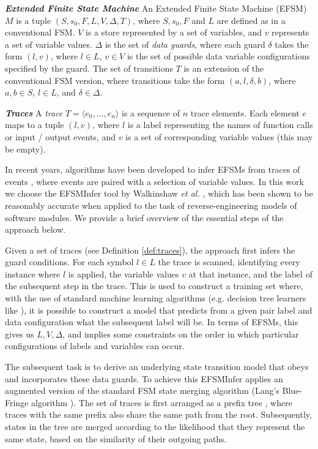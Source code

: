 \documentclass{llncs}
\begin{document}
\begin{definition}\textbf{\emph{Extended Finite State Machine}}
\label{def:efsm}
 An Extended Finite State Machine (EFSM) $M$ is a tuple $(S,s_0,F,L,V,\Delta,T)$, where $S,s_0,F$ and $L$ are defined as in a conventional FSM. $V$ is a store represented by a set of variables, and $v$ represents a set of variable values. $\Delta$ is the set of \emph{data guards}, where each guard $\delta$ takes the form $(l,v)$, where $l \in L$, $v \in V$ is the set of possible data variable configurations specified by the guard. The set of transitions $T$ is an extension of the conventional FSM version, where transitions take the form $(a,l,\delta,b)$, where $a,b \in S$, $l \in L$, and $\delta \in \Delta$. 
\end{definition}
\begin{definition}\textbf{\emph{Traces}}
\label{def:traces}
A \emph{trace} $T=\langle e_0,\ldots,e_n\rangle$ is a sequence of $n$ trace elements. Each element $e$ maps to a tuple $(l,v)$, where $l$ is a label representing the names of function calls or input / output events, and $v$ is a set of corresponding variable values (this may be empty).
\end{definition}

In recent years, algorithms have been developed to infer EFSMs from traces of events \cite{Lorenzoli08,Walkinshaw13}, where events are paired with a selection of variable values. In this work we choose the EFSMInfer tool by Walkinshaw \emph{et al.} \cite{Walkinshaw13}, which has been shown to be reasonably accurate when applied to the task of reverse-engineering models of software modules. We provide a brief overview of the essential steps of the approach below.

Given a set of traces (see Definition \ref{def:traces}), the approach first infers the guard conditions. For each symbol $l \in L$ the trace is scanned, identifying every instance where $l$ is applied, the variable values $v$ at that instance, and the label of the subsequent step in the trace. This is used to construct a training set where, with the use of standard machine learning algorithms (e.g. decision tree learners like \cite{Quinlan93}), it is possible to construct a model that predicts from a given pair label and data configuration what the subsequent label will be. In terms of EFSMs, this gives us $L,V,\Delta$, and implies some constraints on the order in which particular configurations of labels and variables can occur.

The subsequent task is to derive an underlying state transition model that obeys and incorporates these data guards. To achieve this EFSMInfer applies an augmented version of the standard FSM state merging algorithm (Lang's Blue-Fringe algorithm \cite{Lang98}). The set of traces is first arranged as a prefix tree \cite{WalkinshawStam13}, where traces with the same prefix also share the same path from the root. Subsequently, states in the tree are merged according to the likelihood that they represent the same state, based on the similarity of their outgoing paths.
\end{document}
